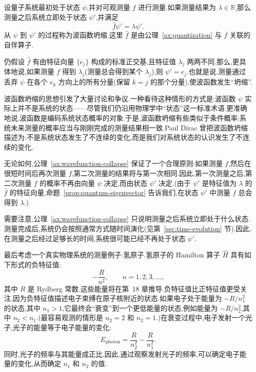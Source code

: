 \begin{axiom}[公理 4:波函数坍缩]\label{ax:wavefunction-collapse}
设量子系统最初处于状态 \(\psi\),并对可观测量 \(f\) 进行测量.如果测量结果为 \(\lambda\in\mathbb{R}\),那么测量之后系统立即处于状态 \(\psi'\),并满足
\[
\widehat f\psi'=\lambda\psi'.
\]
从 \(\psi\) 到 \(\psi'\) 的过程称为波函数坍缩.这里 \(\widehat f\) 是由公理~\ref{ax:quantization} 与 \(f\) 关联的自伴算子.
\end{axiom}

仍假设 \(\widehat f\) 有由特征向量 \(\{e_{j}\}\) 构成的标准正交基,且特征值 \(\lambda_{j}\) 两两不同.那么,更具体地说,如果测量 \(\widehat f\) 得到 \(\lambda_{j}\)(测量总会得到某个 \(\lambda_{j}\)),则 \(\psi'=e_{j}\).也就是说,测量通过丢弃 \(\psi\) 在各个 \(e_{k}\) 方向上的所有分量(保留 \(k=j\) 的那个分量),使波函数发生“坍缩”.

波函数坍缩的思想引发了大量讨论和争议.一种看待这种情形的方式是:波函数 \(\psi\) 实际上并不是系统的状态——尽管我们仍沿用物理学中“状态”这一标准术语.更准确地说,波函数是编码系统状态概率的对象.于是,波函数坍缩有些类似于条件概率:系统未来测量的概率应当与刚刚完成的测量结果相一致.Paul Dirac 曾把波函数坍缩描述为:不是系统状态发生了不连续的变化,而是我们对系统状态的认识发生了不连续的变化.

无论如何,公理~\ref{ax:wavefunction-collapse} 保证了一个合理原则:如果测量 \(f\),然后在很短时间后再次测量 \(f\),第二次测量的结果将与第一次相同.因此,第一次测量之后,第二次测量 \(f\) 的概率不再由向量 \(\psi\) 决定,而由状态 \(\psi'\) 决定.(由于 \(\psi'\) 是特征值为 \(\lambda\) 的 \(\widehat f\) 的特征向量,命题~\ref{prop:quantum-eigenvector} 告诉我们,在状态 \(\psi'\) 中测量 \(f\) 总会得到 \(\lambda\).)

需要注意,公理~\ref{ax:wavefunction-collapse} 只说明测量之后系统立即处于什么状态.测量完成后,系统仍会按照通常方式随时间演化(见第~\ref{sec:time-evolution} 节).因此,在测量之后经过足够长的时间,系统很可能已经不再处于状态 \(\psi'\).

最后考虑一个真实物理系统的测量例子:氢原子.氢原子的 Hamilton 算子 \(\widehat H\) 具有如下形式的负特征值:
\begin{equation}
-\frac{R}{n^{2}},\qquad n=1,2,3,\ldots,
\label{eq:hydrogen-energy-spectrum}
\end{equation}
其中 \(R\) 是 Rydberg 常数.这些能量将在第~18 章推导.负特征值比正特征值更受关注,因为负特征值描述电子束缚在原子核附近的状态.如果电子处于能量为 \(-R/n_{1}^{2}\) 的状态,其中 \(n_{1}>1\),它最终会“衰变”到一个更低能量的状态,例如能量为 \(-R/n_{2}^{2}\),其中 \(n_{2}<n_{1}\).(最容易观测的情形是 \(n_{2}=2\) 和 \(n_{2}=1\).)在衰变过程中,电子发射一个光子,光子的能量等于电子能量的变化:
\begin{equation}
E_{\mathrm{photon}}=\frac{R}{n_{2}^{2}}-\frac{R}{n_{1}^{2}}.
\label{eq:hydrogen-photon-energy}
\end{equation}
同时,光子的频率与其能量成正比.因此,通过观察发射光子的频率,可以确定电子能量的变化,从而确定 \(n_{1}\) 和 \(n_{2}\) 的值.

